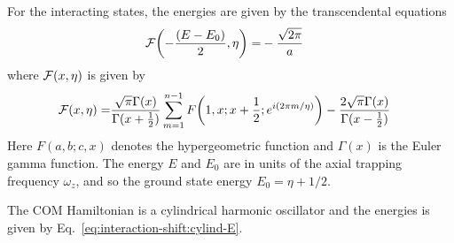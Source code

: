 For the interacting states,
the energies are given by the transcendental equations~\cite{idziaszek_analytical_2006}
\begin{align*}
  \mathcal{F}{\left({-\frac{{\left({E-E_0}\right)}}{2} , \eta}\right)}=&-\frac{\sqrt{2\pi}}{a}
\end{align*}
where $\mathcal{F}{\left({x, \eta}\right)}$ is given by
\begin{align*}
  \mathcal{F}{\left({x, \eta}\right)}=
  &\frac{\sqrt{\pi} \Gamma(x)}{\Gamma(x+\frac{1}{2})}
    \sum_{m=1}^{n-1} F{\left({1,x;x+\frac{1}{2} ; e^{i(2\pi m/ \eta )}}\right)}
    -\frac{2 \sqrt{\pi} \Gamma(x)}{\Gamma(x-\frac{1}{2})}
\end{align*}
Here $F(a,b;c,x)$ denotes the hypergeometric function
and $\Gamma(x)$ is the Euler gamma function.
The energy $E$ and $E_0$ are in units of the axial trapping frequency $\omega_z$,
and so the ground state energy $E_0 = \eta + 1/2$.

The COM Hamiltonian is a cylindrical harmonic oscillator and the energies is given by
Eq.~\ref{eq:interaction-shift:cylind-E}.

